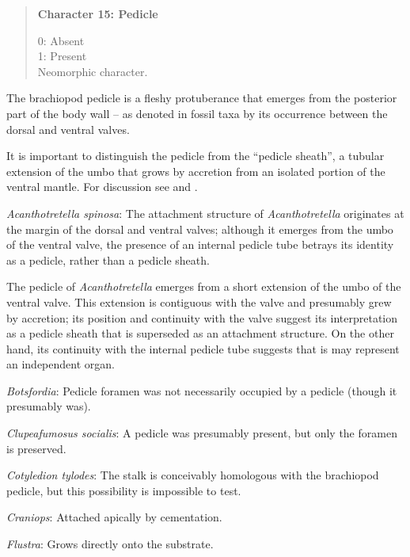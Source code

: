 \documentclass[openany]{book}
\theoremstyle{definition}
\theoremstyle{definition}
\theoremstyle{definition}
\theoremstyle{remark}
\begin{document}
\begin{quote}
\textbf{Character 15: Pedicle}

0: Absent\\
1: Present\\
Neomorphic character.
\end{quote}

The brachiopod pedicle is a fleshy protuberance that emerges from the
posterior part of the body wall -- as denoted in fossil taxa by its
occurrence between the dorsal and ventral valves.

It is important to distinguish the pedicle from the ``pedicle sheath'',
a tubular extension of the umbo that grows by accretion from an isolated
portion of the ventral mantle. For discussion see
\citet{Holmer2018Theattachment} and \citet{Bassett2017Earliestontogeny}.

\hypertarget{Acanthotretella_spinosa-coding-15}{}
\emph{Acanthotretella spinosa}: The attachment structure of
\emph{Acanthotretella} originates at the margin of the dorsal and
ventral valves; although it emerges from the umbo of the ventral valve,
the presence of an internal pedicle tube betrays its identity as a
pedicle, rather than a pedicle sheath.

The pedicle of \emph{Acanthotretella} emerges from a short extension of
the umbo of the ventral valve. This extension is contiguous with the
valve and presumably grew by accretion; its position and continuity with
the valve suggest its interpretation as a pedicle sheath that is
superseded as an attachment structure. On the other hand, its continuity
with the internal pedicle tube suggests that is may represent an
independent organ.

\hypertarget{Botsfordia-coding-15}{}
\emph{Botsfordia}: Pedicle foramen was not necessarily occupied by a
pedicle (though it presumably was).

\hypertarget{Clupeafumosus_socialis-coding-15}{}
\emph{Clupeafumosus socialis}: A pedicle was presumably present, but
only the foramen is preserved.

\hypertarget{Cotyledion_tylodes-coding-15}{}
\emph{Cotyledion tylodes}: The stalk is conceivably homologous with the
brachiopod pedicle, but this possibility is impossible to test.

\hypertarget{Craniops-coding-15}{}
\emph{Craniops}: Attached apically by cementation.

\hypertarget{Flustra-coding-15}{}
\emph{Flustra}: Grows directly onto the substrate.
\end{document}
